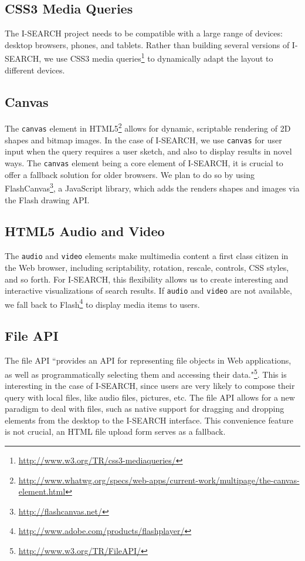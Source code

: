 \documentclass[runningheads,a4paper]{llncs} \usepackage[utf8]{inputenc}
\begin{document}
\subsection{CSS3 Media Queries} 
The \mbox{I-SEARCH} project needs to be compatible with a large range of devices: desktop browsers, phones, and tablets. Rather than building several versions of \mbox{I-SEARCH}, we use CSS3 media queries\footnote{\url{http://www.w3.org/TR/css3-mediaqueries/}} to dynamically adapt the layout to different devices. 

\subsection{Canvas}
The \texttt{canvas} element in HTML5\footnote{\url{http://www.whatwg.org/specs/web-apps/current-work/multipage/the-canvas-element.html}} allows for dynamic, scriptable rendering of 2D shapes and bitmap images. In the case of \mbox{I-SEARCH}, we use \texttt{canvas} for user input when the query requires a user sketch, and also to display results in novel ways. The \texttt{canvas} element being a core element of \mbox{I-SEARCH}, it is crucial to offer a fallback solution for older browsers. We plan to do so by using FlashCanvas\footnote{\url{http://flashcanvas.net/}}, a JavaScript library, which adds the renders shapes and images via the Flash drawing API.

\subsection{HTML5 Audio and Video}
The \texttt{audio} and \texttt{video} elements make multimedia content a first class citizen in the Web browser, including scriptability, rotation, rescale, controls, CSS styles, and so forth. For \mbox{I-SEARCH}, this flexibility allows us to create interesting and interactive visualizations of search results. If \texttt{audio} and \texttt{video} are not available, we fall back to Flash\footnote{\url{http://www.adobe.com/products/flashplayer/}} to display media items to users.

\subsection{File API}
The file API ``provides an API for representing file objects in Web applications, as well as programmatically selecting them and accessing their data."\footnote{\url{http://www.w3.org/TR/FileAPI/}}. This is interesting in the case of \mbox{I-SEARCH}, since users are very likely to compose their query with local files, like audio files, pictures, etc. The file API allows for a new paradigm to deal with files, such as native support for dragging and dropping elements from the desktop to the \mbox{I-SEARCH} interface. This convenience feature is not crucial, an HTML file upload form serves as a fallback.
\end{document}
